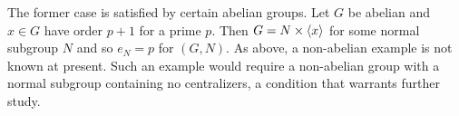 \documentclass[main.tex]{subfiles}
\begin{document}
The former case is satisfied by certain abelian groups. Let $G$ be abelian and $x \in G$ have order $p + 1$ for a prime $p$. Then $G = N \times \langle x \rangle$ for some normal subgroup $N$ and so $e_N = p$ for $(G, N)$. As above, a non-abelian example is not known at present. Such an example would require a non-abelian group with a normal subgroup containing no centralizers, a condition that warrants further study.
\end{document}
